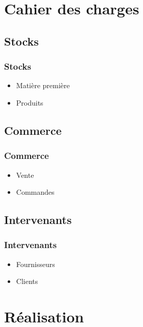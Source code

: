     \section{Cahier des charges}

\subsection{Stocks}
\begin{frame}
\frametitle{Stocks}
\begin{itemize}
    \itemsep2em
    \item Matière première
    \item Produits
\end{itemize}
\end{frame}

\subsection{Commerce}  %
\begin{frame}
\frametitle{Commerce}
\begin{itemize}
    \itemsep2em
    \item Vente
    \item Commandes
\end{itemize}
\end{frame}

\subsection{Intervenants}
\begin{frame}
\frametitle{Intervenants}
\begin{itemize}
    \itemsep2em
    \item Fournisseurs
    \item Clients
\end{itemize}
\end{frame}


    \section{Réalisation}


